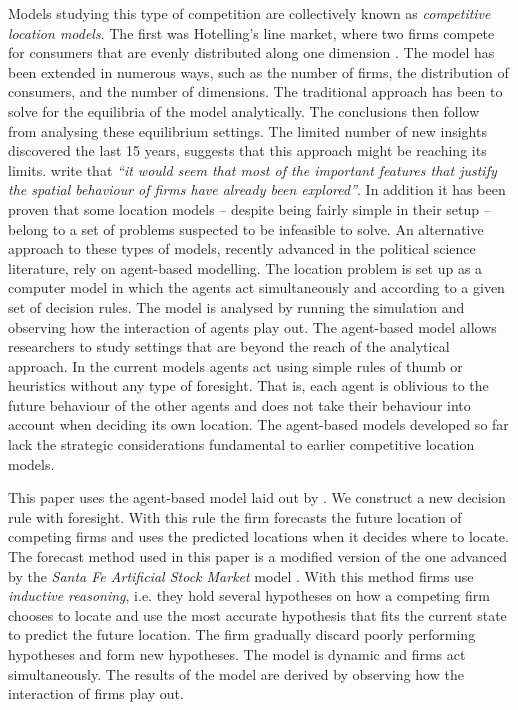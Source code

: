 \documentclass[preprint, 12pt]{elsarticle}
\begin{document}
Models studying this type of competition are collectively known as \emph{competitive location models}. The first was Hotelling's line market, where two firms compete for consumers that are evenly distributed along one dimension \citep{Hotelling_1929}. The model has been extended in numerous ways, such as the number of firms, the distribution of consumers, and the number of dimensions. The traditional approach has been to solve for the equilibria of the model analytically. The conclusions then follow from analysing these equilibrium settings. The limited number of new insights discovered the last 15 years, suggests that this approach might be reaching its limits. \citet[p.~869]{Biscaia_Mota_2013} write that \emph{``it would seem that most of the important features that justify the spatial behaviour of firms have already been explored''}. In addition it has been proven that some location models -- despite being fairly simple in their setup -- belong to a set of problems suspected to be infeasible to solve. An alternative approach to these types of models, recently advanced in the political science literature, rely on agent-based modelling. The location problem is set up as a computer model in which the agents act simultaneously and according to a given set of decision rules. The model is analysed by running the simulation and observing how the interaction of agents play out. The agent-based model allows researchers to study settings that are beyond the reach of the analytical approach. In the current models agents act using simple rules of thumb or heuristics without any type of foresight. That is, each agent is oblivious to the future behaviour of the other agents and does not take their behaviour into account when deciding its own location. The agent-based models developed so far lack the strategic considerations fundamental to earlier competitive location models.

This paper uses the agent-based model laid out by \citet{Laver_Sergenti_2011}. We construct a new decision rule with foresight. With this rule the firm forecasts the future location of competing firms and uses the predicted locations when it decides where to locate. The forecast method used in this paper is a modified version of the one advanced by the \emph{Santa Fe Artificial Stock Market} model \citep[chapter~11]{Arthur_2014}. With this method firms use \emph{inductive reasoning}, i.e. they hold several hypotheses on how a competing firm chooses to locate and use the most accurate hypothesis that fits the current state to predict the future location. The firm gradually discard poorly performing hypotheses and form new hypotheses. The model is dynamic and firms act simultaneously. The results of the model are derived by observing how the interaction of firms play out.
\end{document}
